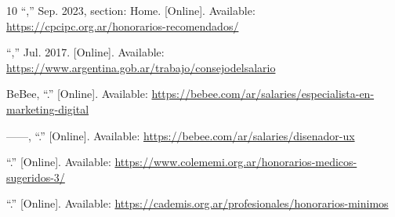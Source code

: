 \begin{thebibliography}{10}
\BIBentryALTinterwordspacing
``,'' Sep. 2023, section:
  Home. [Online]. Available:
  \url{https://cpcipc.org.ar/honorarios-recomendados/}
\BIBentrySTDinterwordspacing

\BIBentryALTinterwordspacing
``,'' Jul. 2017. [Online].
  Available: \url{https://www.argentina.gob.ar/trabajo/consejodelsalario}
\BIBentrySTDinterwordspacing

\BIBentryALTinterwordspacing
BeBee, ``.''
  [Online]. Available:
  \url{https://bebee.com/ar/salaries/especialista-en-marketing-digital}
\BIBentrySTDinterwordspacing

\BIBentryALTinterwordspacing
------, ``.'' [Online]. Available:
  \url{https://bebee.com/ar/salaries/disenador-ux}
\BIBentrySTDinterwordspacing

\BIBentryALTinterwordspacing
``.'' [Online]. Available:
  \url{https://www.colememi.org.ar/honorarios-medicos-sugeridos-3/}
\BIBentrySTDinterwordspacing

\BIBentryALTinterwordspacing
``.'' [Online]. Available:
  \url{https://cademis.org.ar/profesionales/honorarios-minimos}
\BIBentrySTDinterwordspacing

\end{thebibliography}